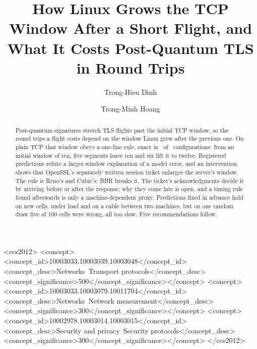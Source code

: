 \documentclass[sigconf,9pt,nonacm]{acmart}
\begin{document}
\title{How Linux Grows the TCP Window After a Short Flight, and What It Costs Post-Quantum TLS in Round Trips}
\author{Trong-Hieu Dinh}
\author{Trong-Minh Hoang}
\begin{abstract}
Post-quantum signatures stretch TLS flights past the initial TCP window, so the round trips a flight costs depend on the window Linux grew after the previous one. On plain TCP that window obeys a one-line rule, exact in \NExact\ of \NCfg\ configurations: from an initial window of ten, five segments leave ten and six lift it to twelve. Registered predictions refute a larger-window explanation of a model error, and an intervention shows that OpenSSL's separately written session ticket enlarges the server's window. The rule is Reno's and Cubic's; BBR breaks it. The ticket's acknowledgments decide it by arriving before or after the response; why they come late is open, and a timing rule found afterwards is only a machine-dependent proxy. Predictions fixed in advance hold on new cells, under load and on a cable between two machines, but on one random draw five of 100 cells were wrong, all too slow. Five recommendations follow.
\end{abstract}
\begin{CCSXML}
<ccs2012>
<concept><concept_id>10003033.10003039.10003048</concept_id><concept_desc>Networks~Transport protocols</concept_desc><concept_significance>500</concept_significance></concept>
<concept><concept_id>10003033.10003079.10011704</concept_id><concept_desc>Networks~Network measurement</concept_desc><concept_significance>300</concept_significance></concept>
<concept><concept_id>10002978.10003014.10003015</concept_id><concept_desc>Security and privacy~Security protocols</concept_desc><concept_significance>300</concept_significance></concept>
</ccs2012>
\end{CCSXML}
\makeatletter\g@addto@macro\@concepts{\linebreak}\makeatother %
\maketitle
\end{document}
